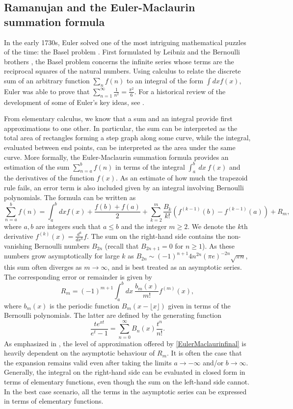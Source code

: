 \documentclass[12pt, letter]{article}
\def\be{\begin{equation}}
\def\ee{\end{equation}}
\begin{document}
\subsection{Ramanujan and the Euler-Maclaurin summation formula} \label{sec:EM}
In the early 1730s, Euler solved one of the most intriguing mathematical puzzles of the time: the Basel problem  \citep{Euler08Reciprocals}.  First formulated by Leibniz and the Bernoulli brothers \citep{Peng02a}, the Basel problem concerns the infinite series whose terms are the reciprocal squares of the natural numbers. Using calculus to relate the discrete sum of an arbitrary function $\sum_n \limits f(n)$ to an integral of the form $\int  dx  f(x)$, Euler was able to prove that $\sum_{n=1}^\infty \frac{1}{n^2}=\frac{\pi^2}{6}$. For a historical review of the development of some of Euler's key ideas, see \citep{Peng07,Ferraro98}.

From elementary calculus, we know that a sum and an integral provide first approximations to one other. In particular,  the sum can be interpreted as the total area of rectangles forming a step graph along some curve, while the integral, evaluated between end points, can  be interpreted as the area under the same curve. More formally, the Euler-Maclaurin summation formula provides an estimation of the sum $\sum \limits_{n=a}^b f(n)$ in terms of the integral $\int_a^b \ dx \ f(x)$ and the derivatives of the function $f(x)$. As an estimate of how much the trapezoid rule fails, an error term is also included given by an integral involving Bernoulli polynomials. The formula can be written as \citep{Candelpergher17}
\begin{equation}\label{EulerMaclaurinfinal}
\sum_{n=a}^b f(n) = \int^b_a dx f(x) + \frac{f(b) + f(a)}{2}+ \sum \limits_{k=2}^{m} \frac{B_{k}}{k!} (f^{(k-1)}(b)-f^{(k-1)} (a))  + R_m,
\end{equation}
where   $a,b$ are integers such that $a \leq b$ and the integer $m \geq 2$.  We denote the $k$th derivative $f^{(k)}(x)=\frac{d^k}{dx^k}f$.  The sum on the right-hand side contains the non-vanishing Bernoulli numbers $B_{2n}$ (recall that $B_{2n+1}=0$ for $n \geq 1$). As these numbers grow asymptotically for large $k$ as $B_{2n} \sim (-1)^{n+1} 4 n^{2n} (\pi e)^{-2n} \sqrt{\pi n }$, this sum often diverges as $m \to \infty$, and is best treated as an asymptotic series. The corresponding error or remainder  is given by 
\be
R_m = (-1)^{m+1} \int^b_a dx \ \frac{b_{m}(x)}{m!} f^{(m)}(x),
\ee
where $b_m(x)$ is the periodic function $B_m(x-\lfloor x \rfloor)$ given in terms of the Bernoulli polynomials. The latter are defined by the generating function
\be
\frac{te^{xt} }{e^{t}-1}=\sum_{n=0}^\infty B_n(x) \frac{t^n}{n!}. 
\ee
 As emphasized in \cite{Tao11}, the level of approximation offered by \eqref{EulerMaclaurinfinal} is heavily dependent on the asymptotic behaviour of $R_m$. It is often the case that the expansion remains valid even after taking the limits $a \rightarrow -\infty$ and/or $b \rightarrow \infty$. Generally, the integral on the right-hand side can be evaluated in closed form in terms of elementary functions, even though the sum on the left-hand side cannot. In the best case  scenario, all the terms in the asymptotic series can be expressed in terms of elementary functions. 
 
\end{document}
